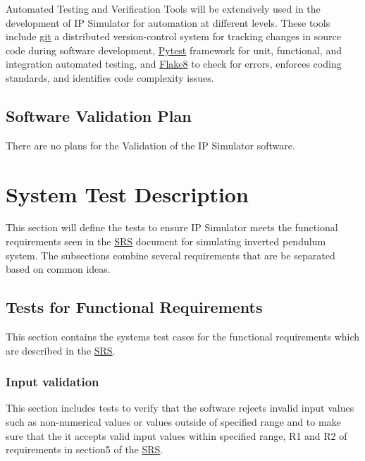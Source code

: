 \documentclass[12pt, titlepage]{article}
\begin{document}
Automated Testing and Verification Tools will be extensively used in the development of IP Simulator for automation at different levels. These tools include \href{https://github.com/MinMah23/CAS741-Project}{git} a distributed version-control system for tracking changes in source code during software development, \href{https://docs.pytest.org/en/7.2.x/}{Pytest} framework for unit, functional, and integration automated testing, and \href{https://flake8.pycqa.org/en/latest/}{Flake8} to check for errors, enforces coding standards, and identifies code complexity issues.

\subsection{Software Validation Plan}

There are no plans for the Validation of the IP Simulator software.

\section{System Test Description}\label{test}
This section will define the tests to ensure IP Simulator meets the functional requirements seen in the \href{https://github.com/MinMah23/CAS741-Project/tree/main/docs/SRS/SRS.pdf}{SRS} document for simulating inverted pendulum system. The subsections combine several requirements that are be separated based on common ideas.

\subsection{Tests for Functional Requirements}
This section contains the systems test cases for the functional requirements which are described in the  \href{https://github.com/MinMah23/CAS741-Project/tree/main/docs/SRS/SRS.pdf}{SRS}.

\subsubsection{Input validation \label{inp_val}}
This section includes tests to verify that the software rejects invalid input values such as non-numerical values or values outside of specified range and to make sure that the it accepts valid input values within specified range, R1 and R2 of requirements in section5 of the  \href{https://github.com/MinMah23/CAS741-Project/tree/main/docs/SRS/SRS.pdf}{SRS}.
\end{document}
